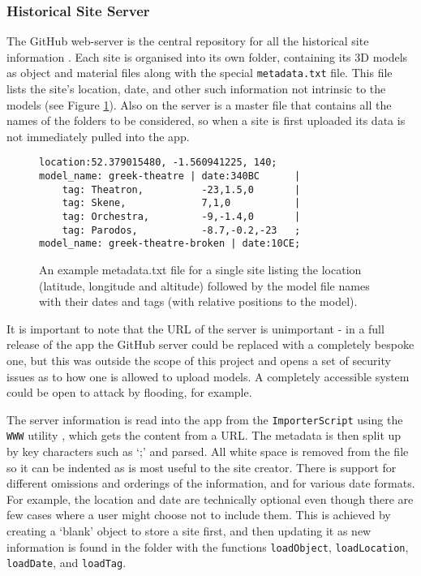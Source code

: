 \documentclass[12pt, a4paper]{article}
\begin{document}
\subsubsection{Historical Site Server}
The GitHub web-server is the central repository for all the historical site information \cite{tools:repo}. Each site is organised into its own folder, containing its 3D models as object and material files along with the special \verb|metadata.txt| file. This file lists the site's location, date, and other such information not intrinsic to the models (see Figure \ref{fig:metadataexample}). Also on the server is a master file that contains all the names of the folders to be considered, so when a site is first uploaded its data is not immediately pulled into the app. 

\begin{figure}[h]
    \centering
\begin{mdframed}[leftmargin=50pt, rightmargin=50pt]
    \begin{verbatim}
location:52.379015480, -1.560941225, 140;
model_name: greek-theatre | date:340BC      |
    tag: Theatron,          -23,1.5,0       |
    tag: Skene,             7,1,0           | 
    tag: Orchestra,         -9,-1.4,0       | 
    tag: Parodos,           -8.7,-0.2,-23   ;
model_name: greek-theatre-broken | date:10CE;\end{verbatim}
\end{mdframed}
    \caption{An example metadata.txt file for a single site listing the location (latitude, longitude and altitude) followed by the model file names with their dates and tags (with relative positions to the model). }
    \label{fig:metadataexample}
\end{figure}

It is important to note that the URL of the server is unimportant - in a full release of the app the GitHub server could be replaced with a completely bespoke one, but this was outside the scope of this project and opens a set of security issues as to how one is allowed to upload models. A completely accessible system could be open to attack by flooding, for example.

The server information is read into the app from the \verb|ImporterScript| using the \verb|WWW| utility \cite{models:www}, which gets the content from a URL. The metadata is then split up by key characters such as `;' and parsed. All white space is removed from the file so it can be indented as is most useful to the site creator. There is support for different omissions and orderings of the information, and for various date formats. For example, the location and date are technically optional even though there are few cases where a user might choose not to include them. This is achieved by creating a `blank' object to store a site first, and then updating it as new information is found in the folder with the functions \verb|loadObject|, \verb|loadLocation|, \verb|loadDate|, and \verb|loadTag|.
\end{document}
